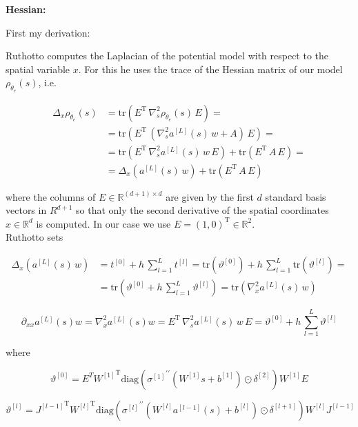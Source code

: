 \textbf{Hessian:}

First my derivation:

Ruthotto computes the Laplacian of the potential model with respect to the spatial variable $x$. For this he uses the trace of the Hessian matrix of our model $\rho_{\theta_e}(s)$, i.e. 

\begin{align*}
    \Delta_x \rho_{\theta_e}(s) & = \mathrm{tr}(E^{\mathrm{T}} \, \nabla^{2}_s \rho_{\theta_e}(s) \, E) = \\
    & = \mathrm{tr}(E^{\mathrm{T}} \, (\nabla^{2}_s a^{[L]}(s) \, w + A) \, E) = \\
    & = \mathrm{tr}(E^{\mathrm{T}} \, \nabla^{2}_s a^{[L]}(s) \, w \, E) + \mathrm{tr}(E^{\mathrm{T}} \,  A \, E) = \\
    & = \Delta_x (a^{[L]}(s) \, w) + \mathrm{tr}(E^{\mathrm{T}} \,  A \, E)
\end{align*}

where the columns of $E \in \mathbb{R}^{(d+1) \times d}$ are given by the first $d$ standard basis vectors in $R^{d+1}$ so that only the second derivative of the spatial coordinates $x \in \mathbb{R}^d$ is computed. In our case we use $E = (1, 0)^{\mathrm{T}} \in \mathbb{R}^{2}$. \\
Ruthotto sets

\begin{align*}
    \Delta_x (a^{[L]}(s) \, w) & = t^{[0]} + h \, \sum^{L}_{l=1} t^{[l]} = \mathrm{tr}(\vartheta^{[0]}) + h \, \sum^{L}_{l=1} \mathrm{tr}(\vartheta^{[l]}) = \\
    & = \mathrm{tr} \left( \vartheta^{[0]} + h \, \sum^{L}_{l=1} \vartheta^{[l]} \right) = \mathrm{tr} \left( \nabla^{2}_x a^{[L]}(s) \, w \right)
\end{align*}

\begin{equation*}
    \partial_{xx} a^{[L]}(s) w = \nabla^{2}_x a^{[L]}(s) w = E^{\mathrm{T}} \, \nabla^{2}_s a^{[L]}(s) \, w \, E = \vartheta^{[0]} + h \, \sum^{L}_{l=1} \vartheta^{[l]}
\end{equation*}

where 

\begin{equation*}
    \vartheta^{[0]} = E^T {W^{[1]}}^{\mathrm{T}} \mathrm{diag}({\sigma^{[1]}}^{\prime \prime}(W^{[1]} s + b^{[1]}) \odot \delta^{[2]}) W^{[1]} E
\end{equation*}

\begin{equation*}
    \vartheta^{[l]} = {J^{[l-1]}}^{\mathrm{T}} {W^{[l]}}^{\mathrm{T}} \mathrm{diag}({\sigma^{[l]}}^{\prime \prime}(W^{[l]} a^{[l-1]}(s) + b^{[l]}) \odot \delta^{[l+1]}) W^{[l]} J^{[l-1]}
\end{equation*}

